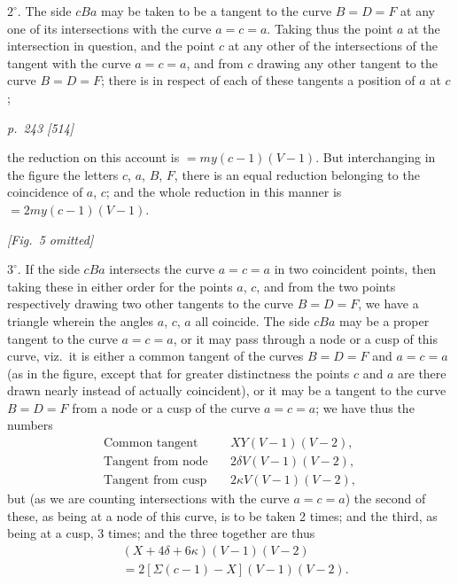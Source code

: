 \documentclass[11pt,a4paper]{book}
\begin{document}
$2^{\circ}$.  The side $c B a$ may be taken to be a tangent to the curve $B = D = F$ at
any one of its intersections with the curve $a = c = a$.  Taking thus the point $a$ at the
intersection in question, and the point $c$ at any other of the intersections of the
tangent with the curve $a = c = a$, and from $c$ drawing any other tangent to the curve
$B = D = F$; there is in respect of each of these tangents a position of $a$ at $c$;

\clearpage

\bigskip
\textit{p.~243 [514]}
\smallskip

\noindent
the reduction on this account is $= my(c - 1)(V - 1)$.  But interchanging in the figure
the letters $c$, $a$, $B$, $F$, there is an equal reduction belonging to the coincidence of $a$, $c$;
and the whole reduction in this manner is $= 2my(c - 1)(V - 1)$.

\begin{center}
\textit{[Fig.~5 omitted]}
\end{center}

$3^{\circ}$.  If the side $cBa$ intersects the curve $a = c = a$ in two coincident points, then
taking these in either order for the points $a$, $c$, and from the two points respectively
drawing two other tangents to the curve $B = D = F$, we have a triangle wherein the
angles $a$, $c$, $a$ all coincide.  The side $cBa$ may be a proper tangent to the curve
$a = c = a$, or it may pass through a node or a cusp of this curve, viz.\ it is either a
common tangent of the curves $B = D = F$ and $a = c = a$ (as in the figure, except that
for greater distinctness the points $c$ and $a$ are there drawn nearly instead of actually
coincident), or it may be a tangent to the curve $B = D = F$ from a node or a cusp of
the curve $a = c = a$; we have thus the numbers
\begin{align*}
\text{Common tangent} &\quad XY(V - 1)(V - 2), \\
\text{Tangent from node} &\quad 2\delta V(V - 1)(V - 2), \\
\text{Tangent from cusp} &\quad 2\kappa V(V - 1)(V - 2),
\end{align*}
but (as we are counting intersections with the curve $a = c = a$) the second of these,
as being at a node of this curve, is to be taken 2 times; and the third, as being at a
cusp, 3 times; and the three together are thus
\begin{align*}
&(X + 4\delta + 6\kappa)(V - 1)(V - 2) \\
&= 2[\Sigma(c - 1) - X](V - 1)(V - 2).
\end{align*}
\end{document}
